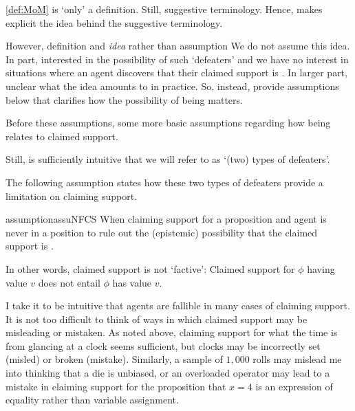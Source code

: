 \begin{note}
  \autoref{def:MoM} is `only' a definition.
  Still, suggestive terminology.
  Hence, \twodefeaters{} makes explicit the idea behind the suggestive terminology.

  However, definition and \emph{idea} rather than assumption
  We do not assume this idea.
  In part, interested in the possibility of such `defeaters' and we have no interest in situations where an agent discovers that their claimed support is \mom{}.
  In larger part, unclear what the idea amounts to in practice.
  So, instead, provide {\color{red} assumptions} below that clarifies how the possibility of being \mom{} matters.

  Before these {\color{red} assumptions}, {\color{red} some more basic assumptions} regarding how being \mom{} relates to claimed support.

  Still, \twodefeaters{} is sufficiently intuitive that we will refer to \mom{} as `(two) types of defeaters'.
\end{note}

\begin{note}
  The following assumption states how these two types of defeaters provide a limitation on claiming support.

  \begin{restatable}[\nfcs{--} -- \nfcs{}]{assumption}{assuNFCS}\label{prop:supp:nfactive}
    When claiming support for a proposition and agent is never in a position to rule out the (epistemic) possibility that the claimed support is \nmom{}.
  \end{restatable}

  In other words, claimed support is not `factive': Claimed support for \(\phi\) having value \(v\) does not entail \(\phi\) has value \(v\).
\end{note}

\begin{note}
  I take it to be intuitive that agents are fallible in many cases of claiming support.
  It is not too difficult to think of ways in which claimed support may be misleading or mistaken.
  As noted above, claiming support for what the time is from glancing at a clock seems sufficient, but clocks may be incorrectly set (misled) or broken (mistake).
  Similarly, a sample of \(1,000\) rolls may mislead me into thinking that a die is unbiased, or an overloaded operator may lead to a mistake in claiming support for the proposition that \(x = 4\) is an expression of equality rather than variable assignment.
\end{note}

